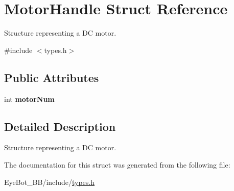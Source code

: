 \hypertarget{struct_motor_handle}{\section{\-Motor\-Handle \-Struct \-Reference}
\label{struct_motor_handle}
}


\-Structure representing a \-D\-C motor.  




{\ttfamily \#include $<$types.\-h$>$}

\subsection*{\-Public \-Attributes}
\begin{DoxyCompactItemize}
\item 
\hypertarget{struct_motor_handle_af8458ff3927fb0dad76d0e829aa56cb5}{int {\bfseries motor\-Num}}\label{struct_motor_handle_af8458ff3927fb0dad76d0e829aa56cb5}

\end{DoxyCompactItemize}


\subsection{\-Detailed \-Description}
\-Structure representing a \-D\-C motor. 

\-The documentation for this struct was generated from the following file\-:\begin{DoxyCompactItemize}
\item 
\-Eye\-Bot\-\_\-\-B\-B/include/\hyperlink{types_8h}{types.\-h}\end{DoxyCompactItemize}
